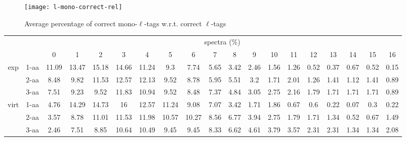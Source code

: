 \documentclass{article}[12pt]
\begin{document}
\begin{figure}
  \begin{center}
\texttt{[image: l-mono-correct-rel]}
\end{center}
\caption{Average percentage of correct mono-$\ell$-tags w.r.t. correct $\ell$-tags}
  \label{fig:l-mono-correct-rel}
\end{figure}


\begin{landscape}
\begin{table}[h]\tiny
\vspace{3mm}
{\centering
\begin{center}
\begin{tabular}{|c|l|c|c|c|c|c|c|c|c|c|c|c|c|c|c|c|c|c|}
  \hline
  \multicolumn{2}{|c|}{ } & \multicolumn{ 17 }{|c|}{ spectra (\%)} \\
  \cline{3- 19}
  \multicolumn{2}{|c|}{ }  & 0 & 1 & 2 & 3 & 4 & 5 & 6 & 7 & 8 & 9 & 10 & 11 & 12 & 13 & 14 & 15 & 16\\
  \hline
  \multirow{3}{*}{exp}
&  1-aa  & 11.09 & 13.47 & 15.18 & 14.66 & 11.24 & 9.3 & 7.74 & 5.65 & 3.42 & 2.46 & 1.56 & 1.26 & 0.52 & 0.37 & 0.67 & 0.52 & 0.15\\
&  2-aa  & 8.48 & 9.82 & 11.53 & 12.57 & 12.13 & 9.52 & 8.78 & 5.95 & 5.51 & 3.2 & 1.71 & 2.01 & 1.26 & 1.41 & 1.12 & 1.41 & 0.89\\
&  3-aa  & 7.51 & 9.23 & 9.52 & 11.83 & 10.94 & 9.52 & 8.48 & 7.37 & 4.84 & 3.05 & 2.75 & 2.16 & 1.79 & 1.71 & 1.71 & 1.71 & 0.89\\
 \hline
  \multirow{3}{*}{virt} 
&  1-aa  & 4.76 & 14.29 & 14.73 & 16 & 12.57 & 11.24 & 9.08 & 7.07 & 3.42 & 1.71 & 1.86 & 0.67 & 0.6 & 0.22 & 0.07 & 0.3 & 0.22\\
&  2-aa  & 3.57 & 8.78 & 11.01 & 11.53 & 11.98 & 10.57 & 10.27 & 8.56 & 6.77 & 3.94 & 2.75 & 1.79 & 1.71 & 1.34 & 0.52 & 0.67 & 1.49\\
&  3-aa  & 2.46 & 7.51 & 8.85 & 10.64 & 10.49 & 9.45 & 9.45 & 8.33 & 6.62 & 4.61 & 3.79 & 3.57 & 2.31 & 2.31 & 1.34 & 1.34 & 2.08\\
 \hline
\end{tabular}
\end{center}
\par}
\centering
\vspace{3mm}
\end{table}


\end{landscape}
\end{document}
